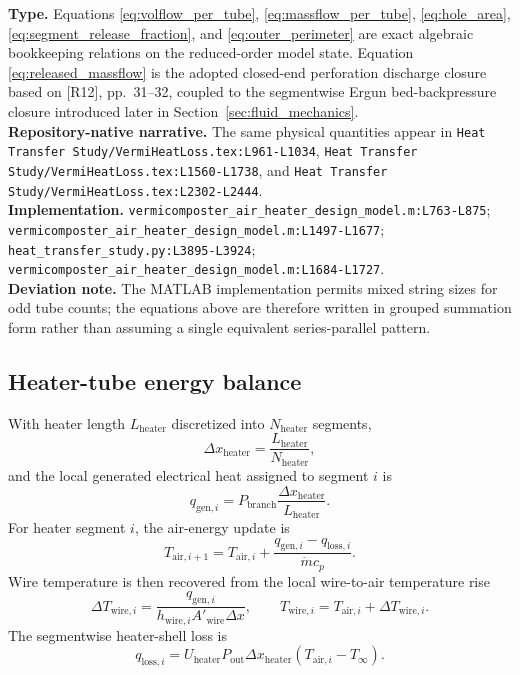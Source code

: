 \documentclass[11pt]{article}
\newcommand{\srcref}[1]{\nolinkurl{#1}}
\newcommand{\filepath}[1]{\nolinkurl{#1}}
\begin{document}
\textbf{Type.} Equations \eqref{eq:volflow_per_tube}, \eqref{eq:massflow_per_tube}, \eqref{eq:hole_area}, \eqref{eq:segment_release_fraction}, and \eqref{eq:outer_perimeter} are exact algebraic bookkeeping relations on the reduced-order model state. Equation \eqref{eq:released_massflow} is the adopted closed-end perforation discharge closure based on [R12], pp.~31--32, coupled to the segmentwise Ergun bed-backpressure closure introduced later in Section~\ref{sec:fluid_mechanics}. \\
\textbf{Repository-native narrative.} The same physical quantities appear in \filepath{Heat Transfer Study/VermiHeatLoss.tex:L961-L1034}, \filepath{Heat Transfer Study/VermiHeatLoss.tex:L1560-L1738}, and \filepath{Heat Transfer Study/VermiHeatLoss.tex:L2302-L2444}. \\
\textbf{Implementation.} \srcref{vermicomposter_air_heater_design_model.m:L763-L875}; \srcref{vermicomposter_air_heater_design_model.m:L1497-L1677}; \srcref{heat_transfer_study.py:L3895-L3924}; \srcref{vermicomposter_air_heater_design_model.m:L1684-L1727}. \\
\textbf{Deviation note.} The MATLAB implementation permits mixed string sizes for odd tube counts; the equations above are therefore written in grouped summation form rather than assuming a single equivalent series-parallel pattern.

\subsection{Heater-tube energy balance}
With heater length \(L_{\mathrm{heater}}\) discretized into \(N_{\mathrm{heater}}\) segments,
\begin{equation}
\label{eq:heater_dx}
\Delta x_{\mathrm{heater}}=\frac{L_{\mathrm{heater}}}{N_{\mathrm{heater}}},
\end{equation}
and the local generated electrical heat assigned to segment \(i\) is
\begin{equation}
\label{eq:heater_segment_generation}
q_{\mathrm{gen},i}=P_{\mathrm{branch}}\frac{\Delta x_{\mathrm{heater}}}{L_{\mathrm{heater}}}.
\end{equation}
For heater segment \(i\), the air-energy update is
\begin{equation}
\label{eq:heater_segment_air}
T_{\mathrm{air},i+1}=T_{\mathrm{air},i}+\frac{q_{\mathrm{gen},i}-q_{\mathrm{loss},i}}{\dot m c_p}.
\end{equation}
Wire temperature is then recovered from the local wire-to-air temperature rise
\begin{equation}
\label{eq:wire_delta_t}
\Delta T_{\mathrm{wire},i}=\frac{q_{\mathrm{gen},i}}{h_{\mathrm{wire},i}A'_{\mathrm{wire}}\Delta x},
\qquad
T_{\mathrm{wire},i}=T_{\mathrm{air},i}+\Delta T_{\mathrm{wire},i}.
\end{equation}
The segmentwise heater-shell loss is
\begin{equation}
\label{eq:heater_segment_loss}
q_{\mathrm{loss},i}=U_{\mathrm{heater}}P_{\mathrm{out}}\Delta x_{\mathrm{heater}}\left(T_{\mathrm{air},i}-T_\infty\right).
\end{equation}
\end{document}
